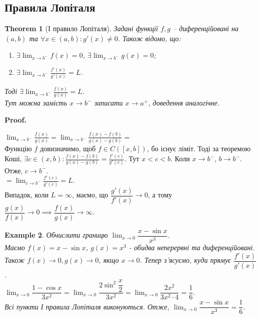 \documentclass[a4paper, 14pt]{article}
\makeatletter
\def\qed{$\blacksquare$}
\theoremstyle{theoremdd}
\newtheorem{theorem}{Theorem}[subsection]
\theoremstyle{theoremdd}
\theoremstyle{theoremdd}
\theoremstyle{theoremdd}
\newtheorem{example}[theorem]{Example}
\theoremstyle{theoremdd}
\theoremstyle{theoremdd}
\theoremstyle{theoremdd}
\theoremstyle{theoremdd}
\renewenvironment{proof}[1][Proof.\\]{\par
\pushQED{\hfill \qed}%
\normalfont \topsep6\p@\@plus6\p@\relax
\trivlist
\item\relax
{\bfseries
#1\@addpunct{.}}\hspace\labelsep\ignorespaces
}{%
\popQED\endtrivlist\@endpefalse
}
\makeatother
\begin{document}
\subsection{Правила Лопіталя}
\begin{theorem}[I правило Лопіталя]
Задані функції $f,g$ -- диференційовані на $(a,b)$ та $\forall x \in (a,b): g'(x) \neq 0$. Також відомо, що:
\begin{enumerate}[nosep,wide=0pt,label={\arabic*)}]
\item $\exists \displaystyle \lim_{x \to b^-} f(x) = 0$, $\exists \displaystyle \lim_{x \to b^-} g(x) = 0$;
\item $\exists \displaystyle \lim_{x \to b^-} \frac{f'(x)}{g'(x)} = L$.
\end{enumerate}
Тоді $\exists \displaystyle \lim_{x \to b^-} \frac{f(x)}{g(x)} = L$.\\
\textit{Тут можна замість $x \to b^-$ записати $x \to a^+$, доведення аналогічне.}
\end{theorem}

\begin{proof}
$\displaystyle \lim_{x \to b^-} \frac{f(x)}{g(x)} = \lim_{x \to b^-} \frac{f(x)-f(b)}{g(x)-g(b)} \boxed{=}$\\
Функцію $f$ довизначимо, щоб $f \in C([x,b])$, бо існує ліміт. Тоді за теоремою Коші, $\exists c \in (x, b): \displaystyle \frac{f(x)-f(b)}{g(x)-g(b)} = \frac{f'(c)}{g'(c)}$. Тут $x < c < b$. Коли $x \to b^-$, $b \to b^-$. Отже, $c \to b^-$.\\
$\boxed{=} \displaystyle \lim_{c \to b^-} \frac{f'(c)}{g'(c)} = L$.
\bigskip \\
Випадок, коли $L = \infty$, маємо, що $\dfrac{g'(x)}{f'(x)} \to 0$, а тому $\dfrac{g(x)}{f(x)} \to 0 \implies \dfrac{f(x)}{g(x)} \to \infty$.
\end{proof}

\begin{example}
Обчислити границю $\displaystyle\lim_{x \to 0} \dfrac{x-\sin x}{x^3}$.\\
Маємо $f(x) = x - \sin x$, $g(x) = x^3$ - обидва неперервні та диференційовані. Також $f(x) \to 0, g(x) \to 0$, якщо $x \to 0$. Тепер з'ясуємо, куди прямує $\dfrac{f'(x)}{g'(x)}$.\\
$\displaystyle\lim_{x \to 0} \dfrac{1-\cos x}{3x^2} = \lim_{x \to 0} \dfrac{2 \sin^2 \dfrac{x}{2}}{3x^2} = \displaystyle\lim_{x \to 0} \dfrac{2x^2}{3x^2 \cdot 4} = \dfrac{1}{6}$.\\
Всі пункти І правила Лопіталя виконуються. Отже, $\displaystyle\lim_{x \to 0} \dfrac{x-\sin x}{x^3} = \dfrac{1}{6}$.
\end{example}
\end{document}
